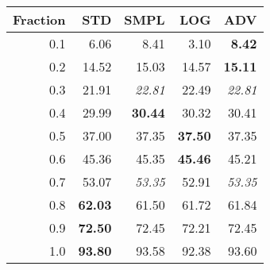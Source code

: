 \documentclass{standalone}
\begin{document}
\begin{tabular}{r|rrrr}
      \toprule
      Fraction & STD & SMPL & LOG & ADV\\
      \midrule
      0.1 & 6.06 & 8.41 & 3.10 & \textbf{8.42}\\
  0.2 & 14.52 & 15.03 & 14.57 & \textbf{15.11}\\
  0.3 & 21.91 & \emph{22.81} & 22.49 & \emph{22.81}\\
  0.4 & 29.99 & \textbf{30.44} & 30.32 & 30.41\\
  0.5 & 37.00 & 37.35 & \textbf{37.50} & 37.35\\
  0.6 & 45.36 & 45.35 & \textbf{45.46} & 45.21\\
  0.7 & 53.07 & \emph{53.35} & 52.91 & \emph{53.35}\\
  0.8 & \textbf{62.03} & 61.50 & 61.72 & 61.84\\
  0.9 & \textbf{72.50} & 72.45 & 72.21 & 72.45\\
  1.0 & \textbf{93.80} & 93.58 & 92.38 & 93.60\\
  \bottomrule
\end{tabular}
\end{document}
